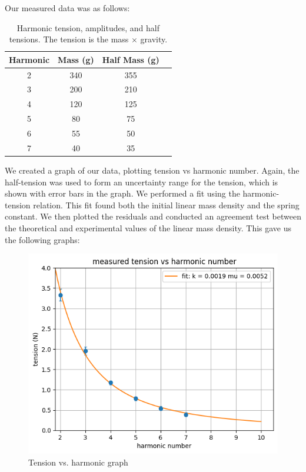 \documentclass[11pt]{article}
\begin{document}
    Our measured data was as follows:
    \begin{table}[H]
        \centering
        \begin{tabular}{|c|c|c|c|}
        \hline
        \textbf{Harmonic} & \textbf{Mass (g)} & \textbf{Half Mass (g)} \\
        \hline
        2 & 340 & 355   \\
        3 & 200 & 210   \\
        4 & 120 & 125   \\
        5 & 80 & 75     \\
        6 & 55 & 50     \\
        7 & 40 & 35     \\
        \hline
        \end{tabular}
        \caption{Harmonic tension, amplitudes, and half tensions. The tension is the mass $\times$ gravity.}
        \label{tab:harmonic_tensions}
    \end{table}

    We created a graph of our data, plotting tension vs harmonic number.
    Again, the half-tension was used to form an uncertainty range for the tension, which is shown with error bars in the graph.
    We performed a fit using the harmonic-tension relation.
    This fit found both the initial linear mass density and the spring constant.
    We then plotted the residuals and conducted an agreement test between the theoretical and experimental values of the linear mass density.
    This gave us the following graphs:

    \begin{figure}[H]
        \includegraphics[width=1\textwidth]{resources/images/p2 measured tension graph}
        \caption{Tension vs. harmonic graph}
        \label{fig:measured_tension}
    \end{figure}
\end{document}
